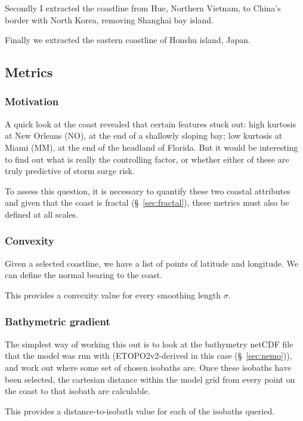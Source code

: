 Secondly I extracted the coastline from Hue, Northern Vietnam, to China's
border with North Korea, removing Shanghai bay island.

Finally we extracted the eastern coastline of Honshu island, Japan.

\subsection{Metrics}
\subsubsection{Motivation}
A quick look at the coast revealed that certain features stuck out:
high kurtosis at New Orleans (NO), at the end of a shallowly sloping bay;
low kurtosis at Miami (MM), at the end of the headland of Florida.
But it would be interesting to find out what is really the controlling
factor, or whether either of these are truly predictive of storm surge risk.

To assess this question, it is necessary to quantify these two coastal attributes
and given that the coast is fractal (§~\ref{sec:fractal}), these metrics must also be defined at
all scales.

\subsubsection{Convexity}
Given a selected coastline, we have a list of points of latitude and longitude.
We can define the normal bearing to the coast.

This provides a convexity value for every smoothing length $\sigma$.

\subsubsection{Bathymetric gradient}
The simplest way of working this out is to look at the
bathymetry netCDF file that the model was run with (ETOPO2v2-derived in this
 case (§~\ref{sec:nemo})), and work out where some set of chosen isobaths are.
Once these isobaths have been selected, the cartesian distance
within the model grid from every point on
the coast to that isobath are calculable.

This provides a distance-to-isobath value for each of the isobaths
queried.
